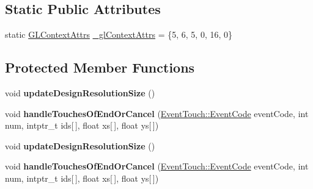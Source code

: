 \subsection*{Static Public Attributes}
\begin{DoxyCompactItemize}
\item 
static \hyperlink{structGLContextAttrs}{G\+L\+Context\+Attrs} \hyperlink{classGLView_a9d594512212b1e389a373d4d067ec058}{\+\_\+gl\+Context\+Attrs} = \{5, 6, 5, 0, 16, 0\}
\end{DoxyCompactItemize}
\subsection*{Protected Member Functions}
\begin{DoxyCompactItemize}
\item 
\mbox{\label{classGLView_a8c1383361ffd8afde6c88dc9713fce02}} 
void {\bfseries update\+Design\+Resolution\+Size} ()
\item 
\mbox{\label{classGLView_a3efba826b120b933c230e20c1cbe1e82}} 
void {\bfseries handle\+Touches\+Of\+End\+Or\+Cancel} (\hyperlink{classEventTouch_a35816ad7349f0b7accc0a30a469b0087}{Event\+Touch\+::\+Event\+Code} event\+Code, int num, intptr\+\_\+t ids\mbox{[}$\,$\mbox{]}, float xs\mbox{[}$\,$\mbox{]}, float ys\mbox{[}$\,$\mbox{]})
\item 
\mbox{\label{classGLView_a8c1383361ffd8afde6c88dc9713fce02}} 
void {\bfseries update\+Design\+Resolution\+Size} ()
\item 
\mbox{\label{classGLView_a3efba826b120b933c230e20c1cbe1e82}} 
void {\bfseries handle\+Touches\+Of\+End\+Or\+Cancel} (\hyperlink{classEventTouch_a35816ad7349f0b7accc0a30a469b0087}{Event\+Touch\+::\+Event\+Code} event\+Code, int num, intptr\+\_\+t ids\mbox{[}$\,$\mbox{]}, float xs\mbox{[}$\,$\mbox{]}, float ys\mbox{[}$\,$\mbox{]})
\end{DoxyCompactItemize}
